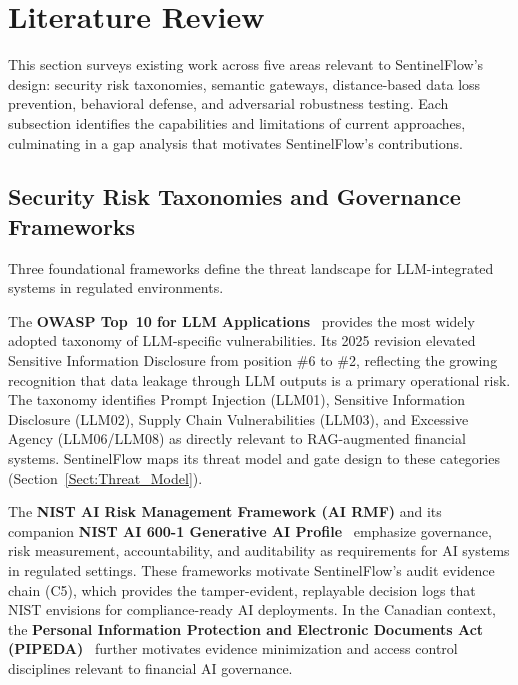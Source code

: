 \documentclass[journal,12pt,onecolumn,draftclsnofoot]{IEEEtran}
\begin{document}
\section{Literature Review}
\label{Sect:Literature_Review}
%

This section surveys existing work across five areas relevant to SentinelFlow's design: security risk taxonomies, semantic gateways, distance-based data loss prevention, behavioral defense, and adversarial robustness testing. Each subsection identifies the capabilities and limitations of current approaches, culminating in a gap analysis that motivates SentinelFlow's contributions.

\subsection{Security Risk Taxonomies and Governance Frameworks}
\label{Sect:LR_Taxonomies}

Three foundational frameworks define the threat landscape for LLM-integrated systems in regulated environments.

The \textbf{OWASP Top~10 for LLM Applications}~\cite{owasp_llm_2025} provides the most widely adopted taxonomy of LLM-specific vulnerabilities. Its 2025 revision elevated Sensitive Information Disclosure from position \#6 to \#2, reflecting the growing recognition that data leakage through LLM outputs is a primary operational risk. The taxonomy identifies Prompt Injection (LLM01), Sensitive Information Disclosure (LLM02), Supply Chain Vulnerabilities (LLM03), and Excessive Agency (LLM06/LLM08) as directly relevant to RAG-augmented financial systems. SentinelFlow maps its threat model and gate design to these categories (Section~\ref{Sect:Threat_Model}).

The \textbf{NIST AI Risk Management Framework (AI RMF)} and its companion \textbf{NIST AI 600-1 Generative AI Profile}~\cite{nist_ai_rmf, nist_ai_600_1} emphasize governance, risk measurement, accountability, and auditability as requirements for AI systems in regulated settings. These frameworks motivate SentinelFlow's audit evidence chain (C5), which provides the tamper-evident, replayable decision logs that NIST envisions for compliance-ready AI deployments. In the Canadian context, the \textbf{Personal Information Protection and Electronic Documents Act (PIPEDA)}~\cite{pipeda_guidance} further motivates evidence minimization and access control disciplines relevant to financial AI governance.
\end{document}
